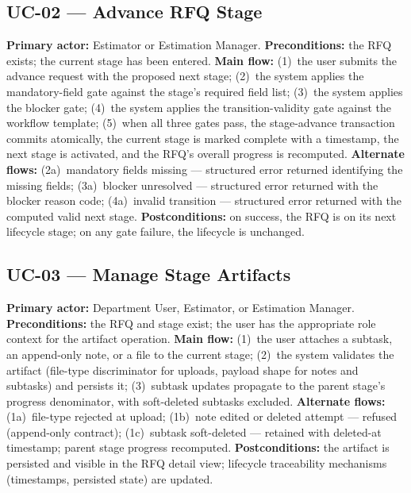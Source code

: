 \subsection{UC-02 --- Advance RFQ Stage}
\textbf{Primary actor:} Estimator or Estimation Manager. \textbf{Preconditions:} the RFQ exists; the current stage has been entered. \textbf{Main flow:} (1)~the user submits the advance request with the proposed next stage; (2)~the system applies the mandatory-field gate against the stage's required field list; (3)~the system applies the blocker gate; (4)~the system applies the transition-validity gate against the workflow template; (5)~when all three gates pass, the stage-advance transaction commits atomically, the current stage is marked complete with a timestamp, the next stage is activated, and the RFQ's overall progress is recomputed. \textbf{Alternate flows:} (2a)~mandatory fields missing --- structured error returned identifying the missing fields; (3a)~blocker unresolved --- structured error returned with the blocker reason code; (4a)~invalid transition --- structured error returned with the computed valid next stage. \textbf{Postconditions:} on success, the RFQ is on its next lifecycle stage; on any gate failure, the lifecycle is unchanged.

\subsection{UC-03 --- Manage Stage Artifacts}
\textbf{Primary actor:} Department User, Estimator, or Estimation Manager. \textbf{Preconditions:} the RFQ and stage exist; the user has the appropriate role context for the artifact operation. \textbf{Main flow:} (1)~the user attaches a subtask, an append-only note, or a file to the current stage; (2)~the system validates the artifact (file-type discriminator for uploads, payload shape for notes and subtasks) and persists it; (3)~subtask updates propagate to the parent stage's progress denominator, with soft-deleted subtasks excluded. \textbf{Alternate flows:} (1a)~file-type rejected at upload; (1b)~note edited or deleted attempt --- refused (append-only contract); (1c)~subtask soft-deleted --- retained with deleted-at timestamp; parent stage progress recomputed. \textbf{Postconditions:} the artifact is persisted and visible in the RFQ detail view; lifecycle traceability mechanisms (timestamps, persisted state) are updated.

